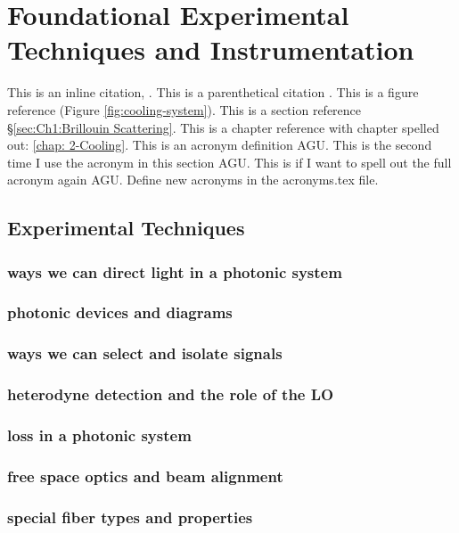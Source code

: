 \chapter{Foundational Experimental Techniques and Instrumentation}
\label{ch:Experimental}
\acresetall

This is an inline citation, \cite{boyd2020nonlinear}. This is a parenthetical citation \citep{boyd2020nonlinear}. This is a figure reference (Figure \ref{fig:cooling-system}). This is a section reference \S\ref{sec:Ch1:Brillouin Scattering}. This is a chapter reference with chapter spelled out: \autoref{chap: 2-Cooling}. This is an acronym definition \ac{AGU}. This is the second time I use the acronym in this section \ac{AGU}. This is if I want to spell out the full acronym again \acf{AGU}. Define new acronyms in the acronyms.tex file.


\section{Experimental Techniques}
\label{sec:Experimental:Experimental Techniques}
\lipsum[1]

  \subsection{ways we can direct light in a photonic system}
  \subsection{photonic devices and diagrams}
  \subsection{ways we can select and isolate signals}
  \subsection{heterodyne detection and the role of the LO}
  \subsection{loss in a photonic system}
  \subsection{free space optics and beam alignment}
  \subsection{special fiber types and properties}

